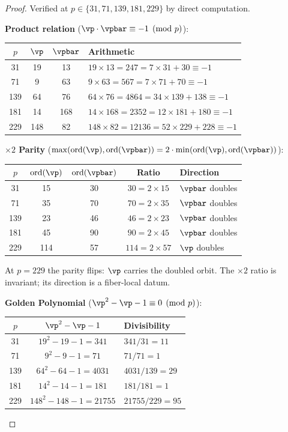 \begin{proof}
Verified at $p \in \{31, 71, 139, 181, 229\}$ by direct computation.

\medskip\noindent\textbf{Product relation} ($\vp \cdot \vpbar \equiv -1 \pmod{p}$):
\begin{center}\small
\begin{tabular}{@{}cccl@{}}
\toprule
$p$ & $\vp$ & $\vpbar$ & Arithmetic \\
\midrule
31 & 19 & 13 & $19 \times 13 = 247 = 7 \times 31 + 30 \equiv -1$ \\
71 & 9 & 63 & $9 \times 63 = 567 = 7 \times 71 + 70 \equiv -1$ \\
139 & 64 & 76 & $64 \times 76 = 4864 = 34 \times 139 + 138 \equiv -1$ \\
181 & 14 & 168 & $14 \times 168 = 2352 = 12 \times 181 + 180 \equiv -1$ \\
229 & 148 & 82 & $148 \times 82 = 12136 = 52 \times 229 + 228 \equiv -1$ \\
\bottomrule
\end{tabular}
\end{center}

\medskip\noindent\textbf{$\times 2$ Parity} ($\max(\mathrm{ord}(\vp), \mathrm{ord}(\vpbar)) = 2 \cdot \min(\mathrm{ord}(\vp), \mathrm{ord}(\vpbar))$):
\begin{center}\small
\begin{tabular}{@{}ccccl@{}}
\toprule
$p$ & $\mathrm{ord}(\vp)$ & $\mathrm{ord}(\vpbar)$ & Ratio & Direction \\
\midrule
31 & 15 & 30 & $30 = 2 \times 15$ & $\vpbar$ doubles \\
71 & 35 & 70 & $70 = 2 \times 35$ & $\vpbar$ doubles \\
139 & 23 & 46 & $46 = 2 \times 23$ & $\vpbar$ doubles \\
181 & 45 & 90 & $90 = 2 \times 45$ & $\vpbar$ doubles \\
229 & 114 & 57 & $114 = 2 \times 57$ & $\vp$ doubles \\
\bottomrule
\end{tabular}
\end{center}
At $p = 229$ the parity flips: $\vp$ carries the doubled orbit. The $\times 2$ ratio is invariant; its direction is a fiber-local datum.

\medskip\noindent\textbf{Golden Polynomial} ($\vp^2 - \vp - 1 \equiv 0 \pmod{p}$):
\begin{center}\small
\begin{tabular}{@{}ccl@{}}
\toprule
$p$ & $\vp^2 - \vp - 1$ & Divisibility \\
\midrule
31 & $19^2 - 19 - 1 = 341$ & $341 / 31 = 11$ \\
71 & $9^2 - 9 - 1 = 71$ & $71 / 71 = 1$ \\
139 & $64^2 - 64 - 1 = 4031$ & $4031 / 139 = 29$ \\
181 & $14^2 - 14 - 1 = 181$ & $181 / 181 = 1$ \\
229 & $148^2 - 148 - 1 = 21755$ & $21755 / 229 = 95$ \\
\bottomrule
\end{tabular}
\end{center}
\qedhere
\end{proof}

